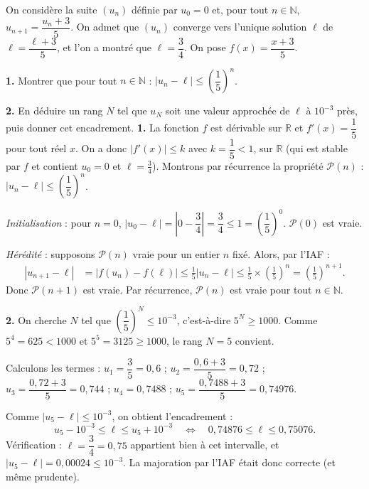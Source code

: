 \documentclass[11pt]{article}
\begin{document}
\begin{exoresolu}[Encadrement de la limite de $u_{n+1} = \dfrac{u_n + 3}{5}$ à $10^{-3}$ près]
On considère la suite $(u_n)$ définie par $u_0 = 0$ et, pour tout $n \in \mathbb{N}$, $u_{n+1} = \dfrac{u_n + 3}{5}$. On admet que $(u_n)$ converge vers l'unique solution $\ell$ de $\ell = \dfrac{\ell + 3}{5}$, et l'on a montré que $\ell = \dfrac{3}{4}$. On pose $f(x) = \dfrac{x+3}{5}$.

\textbf{1.} Montrer que pour tout $n \in \mathbb{N}$ : $|u_n - \ell| \leq \left(\dfrac{1}{5}\right)^n$.

\textbf{2.} En déduire un rang $N$ tel que $u_N$ soit une valeur approchée de $\ell$ à $10^{-3}$ près, puis donner cet encadrement.
\tcblower
\textbf{1.} La fonction $f$ est dérivable sur $\mathbb{R}$ et $f'(x) = \dfrac{1}{5}$ pour tout réel $x$. On a donc $|f'(x)| \leq k$ avec $k = \dfrac{1}{5} < 1$, sur $\mathbb{R}$ (qui est stable par $f$ et contient $u_0 = 0$ et $\ell = \tfrac{3}{4}$). Montrons par récurrence la propriété $\mathcal{P}(n)$ : $|u_n - \ell| \leq \left(\dfrac{1}{5}\right)^n$.

\emph{Initialisation} : pour $n = 0$, $|u_0 - \ell| = \left|0 - \dfrac{3}{4}\right| = \dfrac{3}{4} \leq 1 = \left(\dfrac{1}{5}\right)^0$. $\mathcal{P}(0)$ est vraie.

\emph{Hérédité} : supposons $\mathcal{P}(n)$ vraie pour un entier $n$ fixé. Alors, par l'IAF :
\begin{align*}
|u_{n+1} - \ell| &= |f(u_n) - f(\ell)| \leq \frac{1}{5}|u_n - \ell| \leq \frac{1}{5}\times\left(\frac{1}{5}\right)^n = \left(\frac{1}{5}\right)^{n+1}.
\end{align*}
Donc $\mathcal{P}(n+1)$ est vraie. Par récurrence, $\mathcal{P}(n)$ est vraie pour tout $n \in \mathbb{N}$.

\textbf{2.} On cherche $N$ tel que $\left(\dfrac{1}{5}\right)^N \leq 10^{-3}$, c'est-à-dire $5^N \geq 1000$. Comme $5^4 = 625 < 1000$ et $5^5 = 3125 \geq 1000$, le rang $N = 5$ convient.

Calculons les termes : $u_1 = \dfrac{3}{5} = 0{,}6$ ; $u_2 = \dfrac{0{,}6 + 3}{5} = 0{,}72$ ; $u_3 = \dfrac{0{,}72 + 3}{5} = 0{,}744$ ; $u_4 = 0{,}7488$ ; $u_5 = \dfrac{0{,}7488 + 3}{5} = 0{,}74976$.

Comme $|u_5 - \ell| \leq 10^{-3}$, on obtient l'encadrement :
\[ u_5 - 10^{-3} \leq \ell \leq u_5 + 10^{-3} \quad \Longleftrightarrow \quad 0{,}74876 \leq \ell \leq 0{,}75076. \]
Vérification : $\ell = \dfrac{3}{4} = 0{,}75$ appartient bien à cet intervalle, et $|u_5 - \ell| = 0{,}00024 \leq 10^{-3}$. La majoration par l'IAF était donc correcte (et même prudente).
\end{exoresolu}
\end{document}
